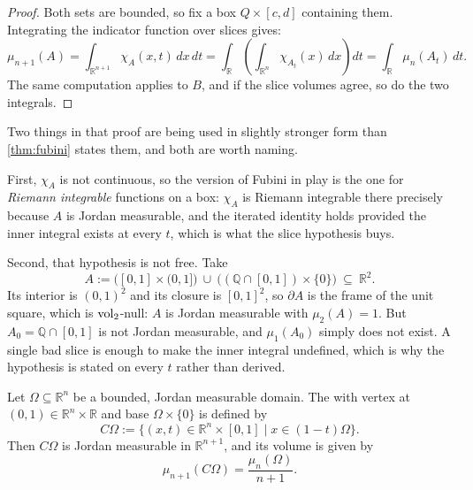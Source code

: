 \begin{proof}
Both sets are bounded, so fix a box $Q\times[c,d]$ containing them. Integrating the indicator
function over slices gives:
\[
\mu_{n+1}(A) = \int_{\mathbb{R}^{n+1}} \chi_A(x,t) \,dx\,dt = \int_{\mathbb{R}} \left( \int_{\mathbb{R}^n} \chi_{A_t}(x) \,dx \right) dt = \int_{\mathbb{R}} \mu_n(A_t) \,dt.
\]
The same computation applies to $B$, and if the slice volumes agree, so do the two integrals.
\end{proof}

\begin{ainote}
\label{note:cavalieri_hypotheses}
Two things in that proof are being used in slightly stronger form than
\cref{thm:fubini} states them, and both are worth naming.

First, $\chi_A$ is not continuous, so the version of Fubini in play is the one for
\emph{Riemann integrable} functions on a box: $\chi_A$ is Riemann integrable there precisely
because $A$ is Jordan measurable, and the iterated identity holds provided the inner integral
exists at every $t$, which is what the slice hypothesis buys.

Second, that hypothesis is not free. Take
\[A := \big([0,1]\times(0,1]\big) \ \cup\ \big((\mathbb{Q}\cap[0,1])\times\{0\}\big)
  \ \subseteq\ \mathbb{R}^2 .\]
Its interior is $(0,1)^2$ and its closure is $[0,1]^2$, so $\partial A$ is the frame of the unit
square, which is $\operatorname{vol}_2$-null: $A$ is Jordan measurable with $\mu_2(A) = 1$. But
$A_0 = \mathbb{Q}\cap[0,1]$ is not Jordan measurable, and $\mu_1(A_0)$ simply does not exist. A
single bad slice is enough to make the inner integral undefined, which is why the hypothesis is
stated on every $t$ rather than derived.
\end{ainote}

\begin{theorem}
\label{thm:cone_volume_formula}
Let $\Omega \subseteq \mathbb{R}^n$ be a bounded, Jordan measurable domain. The   with vertex at $(0,1) \in \mathbb{R}^n \times \mathbb{R}$ and base $\Omega \times \{0\}$ is defined by
\[
C\Omega := \big\{(x, t) \in \mathbb{R}^n \times [0,1] \mid x \in (1-t)\Omega\big\}.
\]
Then $C\Omega$ is Jordan measurable in $\mathbb{R}^{n+1}$, and its volume is given by
\[
\mu_{n+1}(C\Omega) = \frac{\mu_n(\Omega)}{n+1}.
\]
\end{theorem}

